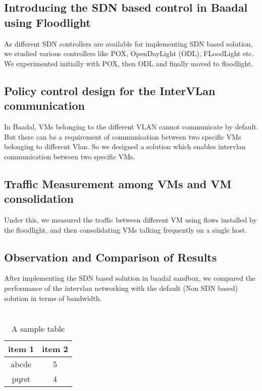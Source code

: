 \subsection{Introducing the SDN based control in Baadal using Floodlight}
As different SDN controllers are available for implementing SDN based solution, we studied various controllers like POX, OpenDayLight (ODL), FLoodLight etc. We experimented initially with POX, then ODL and finally moved to floodlight.
\subsection{Policy control design for the InterVLan communication}
In Baadal, VMs belonging to the different VLAN cannot communicate by default. But there can be a requirement of communication between two specific VMs belonging to different Vlan. So we designed a solution which enables intervlan communication between two specific VMs.

\subsection{Traffic Measurement among VMs and VM consolidation}
Under this, we measured the traffic between different VM using flows installed by the floodlight, and then consolidating VMs talking frequently on a single host.

\subsection{Observation and Comparison of Results}
After implementing the SDN based solution in baadal sandbox, we compared the performance of the intervlan networking with the default (Non SDN based) solution in terms of bandwidth.  




\section{}


\begin{table}
\centering
\begin{tabular}{| c | c |}
\hline
{\bf item 1} & {\bf item 2} \\ \hline
%
abcde & 5 \\ \hline
%
pqrst & 4 \\ \hline
\end{tabular}
\caption{A sample table}
\label{table:1}
\end{table}